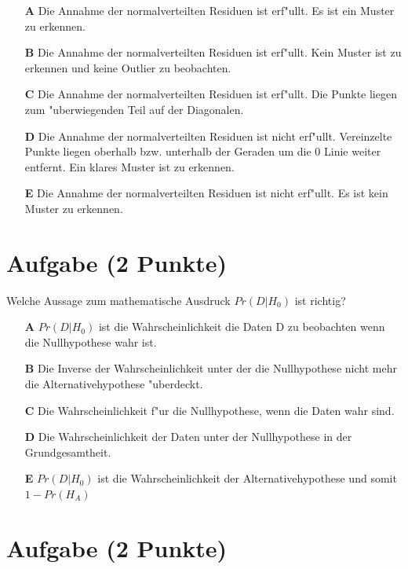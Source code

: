 \documentclass[a4paper, 10pt]{scrartcl}\usepackage[]{graphicx}\usepackage[]{xcolor}
\begin{document}
\begin{enumerate}
\item [\textbf{A} \msquare] Die Annahme der normalverteilten Residuen ist erf{"u}llt. Es ist ein Muster zu erkennen.
\item [\textbf{B} \msquare] Die Annahme der normalverteilten Residuen ist erf{"u}llt. Kein Muster ist zu erkennen und keine Outlier zu beobachten.
\item [\textbf{C} \msquare] Die Annahme der normalverteilten Residuen ist erf{"u}llt. Die Punkte liegen zum {"u}berwiegenden Teil auf der Diagonalen.
\item [\textbf{D} \msquare] Die Annahme der normalverteilten Residuen ist nicht erf{"u}llt. Vereinzelte Punkte liegen oberhalb bzw. unterhalb der Geraden um die 0 Linie weiter entfernt. Ein klares Muster ist zu erkennen.
\item [\textbf{E} \msquare] Die Annahme der normalverteilten Residuen ist nicht erf{"u}llt. Es ist kein Muster zu erkennen.
\end{enumerate}

\section{Aufgabe \hfill (2 Punkte)}

Welche Aussage zum mathematische Ausdruck $Pr(D|H_0)$ ist richtig? 



\begin{enumerate}
\item [\textbf{A} \msquare] $Pr(D|H_0)$ ist die Wahrscheinlichkeit die Daten D zu beobachten wenn die Nullhypothese wahr ist.
\item [\textbf{B} \msquare] Die Inverse der Wahrscheinlichkeit unter der die Nullhypothese nicht mehr die Alternativehypothese {"u}berdeckt.
\item [\textbf{C} \msquare] Die Wahrscheinlichkeit f{"u}r die Nullhypothese, wenn die Daten wahr sind.
\item [\textbf{D} \msquare] Die Wahrscheinlichkeit der Daten unter der Nullhypothese in der Grundgesamtheit.
\item [\textbf{E} \msquare] $Pr(D|H_0)$ ist die Wahrscheinlichkeit der Alternativehypothese und somit $1 - Pr(H_A)$
\end{enumerate}

\section{Aufgabe \hfill (2 Punkte)}
\end{document}
